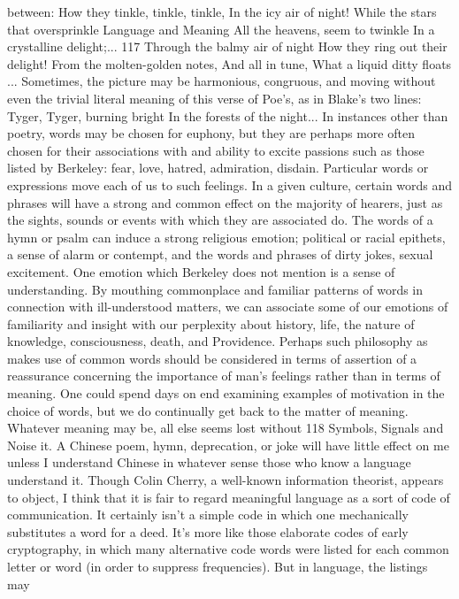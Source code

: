 {{{between:
How they tinkle, tinkle, tinkle,
In the icy air of night!
While the stars that oversprinkle
Language and Meaning
All the heavens, seem to twinkle
In a crystalline delight;...
117
Through the balmy air of night
How they ring out their delight!
From the molten-golden notes,
And all in tune,
What a liquid ditty floats ...
Sometimes, the picture may be harmonious, congruous, and
moving without even the trivial literal meaning of this verse of
Poe’s, as in Blake’s two lines:
Tyger, Tyger, burning bright
In the forests of the night...
In instances other than poetry, words may be chosen for euphony,
but they are perhaps more often chosen for their associations with
and ability to excite passions such as those listed by Berkeley: fear,
love, hatred, admiration, disdain. Particular words or expressions
move each of us to such feelings. In a given culture, certain words
and phrases will have a strong and common effect on the majority
of hearers, just as the sights, sounds or events with which they are
associated do. The words of a hymn or psalm can induce a strong
religious emotion; political or racial epithets, a sense of alarm or
contempt, and the words and phrases of dirty jokes, sexual
excitement.
One emotion which Berkeley does not mention is a sense of
understanding. By mouthing commonplace and familiar patterns
of words in connection with ill-understood matters, we can associate
some of our emotions of familiarity and insight with our perplexity
about history, life, the nature of knowledge, consciousness,
death, and Providence. Perhaps such philosophy as makes use of
common words should be considered in terms of assertion of a
reassurance concerning the importance of man’s feelings rather
than in terms of meaning.
One could spend days on end examining examples of motivation
in the choice of words, but we do continually get back to the matter
of meaning. Whatever meaning may be, all else seems lost without
118
Symbols, Signals and Noise
it. A Chinese poem, hymn, deprecation, or joke will have little effect
on me unless I understand Chinese in whatever sense those who
know a language understand it.
Though Colin Cherry, a well-known information theorist, appears
to object, I think that it is fair to regard meaningful language
as a sort of code of communication. It certainly isn’t a simple code
in which one mechanically substitutes a word for a deed. It’s more
like those elaborate codes of early cryptography, in which many
alternative code words were listed for each common letter or word
(in order to suppress frequencies). But in language, the listings may
}}}
